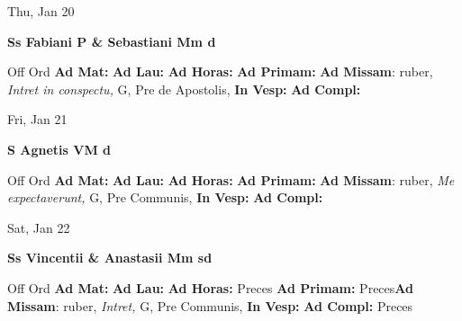 \documentclass[10pt]{memoir}
\begin{document}
\begin{center}
\begin{minipage}{3.5in}
\vspace{2em}
\begin{center}Thu, Jan 20
\end{center}
\textbf{ \large Ss Fabiani P \& Sebastiani Mm
\textnormal{\normalsize d}}

\begin{justify}Off Ord
\textbf{Ad Mat: }
\textbf{Ad Lau: }
\textbf{Ad Horas: }
\textbf{Ad Primam: }\textbf{Ad Missam}: ruber, \textit{Intret in conspectu,} G, Pre de Apostolis, 
\textbf{In Vesp: }
\textbf{Ad Compl: }
\end{justify}
\end{minipage}
\end{center}

\begin{center}
\begin{minipage}{3.5in}
\vspace{2em}
\begin{center}Fri, Jan 21
\end{center}
\textbf{ \large S Agnetis VM
\textnormal{\normalsize d}}

\begin{justify}Off Ord
\textbf{Ad Mat: }
\textbf{Ad Lau: }
\textbf{Ad Horas: }
\textbf{Ad Primam: }\textbf{Ad Missam}: ruber, \textit{Me expectaverunt,} G, Pre Communis, 
\textbf{In Vesp: }
\textbf{Ad Compl: }
\end{justify}
\end{minipage}
\end{center}

\begin{center}
\begin{minipage}{3.5in}
\vspace{2em}
\begin{center}Sat, Jan 22
\end{center}
\textbf{ \large Ss Vincentii \& Anastasii Mm
\textnormal{\normalsize sd}}

\begin{justify}Off Ord
\textbf{Ad Mat: }
\textbf{Ad Lau: }
\textbf{Ad Horas: }Preces
\textbf{Ad Primam: }Preces\textbf{Ad Missam}: ruber, \textit{Intret,} G, Pre Communis, 
\textbf{In Vesp: }
\textbf{Ad Compl: }Preces
\end{justify}
\end{minipage}
\end{center}
\end{document}
